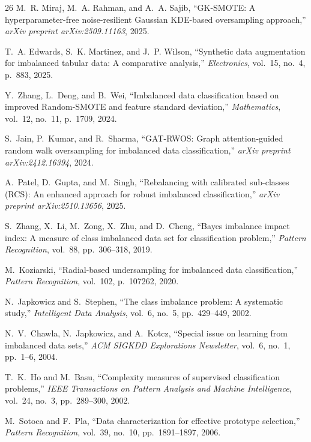 \documentclass[12pt,a4paper]{article}
\theoremstyle{definition}
\begin{document}
\begin{thebibliography}{26}
M.~R. Miraj, M.~A. Rahman, and A.~A. Sajib,
``GK-SMOTE: A hyperparameter-free noise-resilient Gaussian KDE-based oversampling approach,''
\emph{arXiv preprint arXiv:2509.11163}, 2025.

T.~A. Edwards, S.~K. Martinez, and J.~P. Wilson,
``Synthetic data augmentation for imbalanced tabular data: A comparative analysis,''
\emph{Electronics}, vol.~15, no.~4, p.~883, 2025.

Y.~Zhang, L.~Deng, and B.~Wei,
``Imbalanced data classification based on improved Random-SMOTE and feature standard deviation,''
\emph{Mathematics}, vol.~12, no.~11, p.~1709, 2024.

S.~Jain, P.~Kumar, and R.~Sharma,
``GAT-RWOS: Graph attention-guided random walk oversampling for imbalanced data classification,''
\emph{arXiv preprint arXiv:2412.16394}, 2024.

A.~Patel, D.~Gupta, and M.~Singh,
``Rebalancing with calibrated sub-classes (RCS): An enhanced approach for robust imbalanced classification,''
\emph{arXiv preprint arXiv:2510.13656}, 2025.

S.~Zhang, X.~Li, M.~Zong, X.~Zhu, and D.~Cheng,
``Bayes imbalance impact index: A measure of class imbalanced data set for classification problem,''
\emph{Pattern Recognition}, vol.~88, pp.~306--318, 2019.

M.~Koziarski,
``Radial-based undersampling for imbalanced data classification,''
\emph{Pattern Recognition}, vol.~102, p.~107262, 2020.

N.~Japkowicz and S.~Stephen,
``The class imbalance problem: A systematic study,''
\emph{Intelligent Data Analysis}, vol.~6, no.~5, pp.~429--449, 2002.

N.~V.~Chawla, N.~Japkowicz, and A.~Kotcz,
``Special issue on learning from imbalanced data sets,''
\emph{ACM SIGKDD Explorations Newsletter}, vol.~6, no.~1, pp.~1--6, 2004.

T.~K.~Ho and M.~Basu,
``Complexity measures of supervised classification problems,''
\emph{IEEE Transactions on Pattern Analysis and Machine Intelligence}, vol.~24, no.~3, pp.~289--300, 2002.

M.~Sotoca and F.~Pla,
``Data characterization for effective prototype selection,''
\emph{Pattern Recognition}, vol.~39, no.~10, pp.~1891--1897, 2006.


\end{thebibliography}
\end{document}
